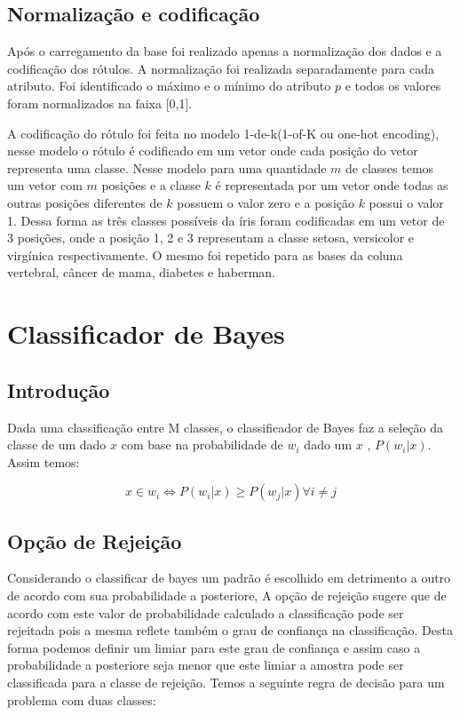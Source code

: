 \documentclass[ 
	article,			%
	11pt,				%
	oneside,			%
	a4paper,			%
	english,			%
	brazil,				%
	]{abntex2}
\begin{document}
\subsection{Normalização e codificação}
\label{ss:normCodf} 
Após o carregamento da base foi realizado apenas a normalização dos dados e a
codificação dos rótulos. A normalização foi realizada separadamente para cada
atributo. Foi identificado o máximo e o mínimo do atributo $p$ e todos os
valores foram normalizados na faixa [0,1].

A codificação do rótulo foi feita no modelo 1-de-k(1-of-K ou one-hot encoding),
nesse modelo o rótulo é codificado em um vetor onde cada posição do
vetor representa uma classe. Nesse modelo para uma quantidade $m$ de classes
temos um vetor com $m$ posições e a classe $k$ é representada por um vetor
onde todas as outras posições diferentes de $k$ possuem o valor zero e a
posição $k$ possui o valor 1. Dessa forma as três classes possíveis da íris
foram codificadas em um vetor de 3 posições, onde a posição 1, 2 e 3
representam a classe setosa, versicolor e virgínica respectivamente. O mesmo foi
repetido para as bases da coluna vertebral, câncer de mama, diabetes e haberman.


\section{Classificador de Bayes}
\subsection{Introdução}
Dada uma classificação entre M classes, o classificador de Bayes faz a seleção
da classe de um dado $x$ com base na probabilidade de $w_i$ dado um $x$ ,
$P(w_i|x)$.
Assim temos:


\begin{equation}
	x \in w_i \iff P(w_i|x) \geq P(w_j|x) \forall i \neq j
\end{equation}

\subsection{Opção de Rejeição}
Considerando o classificar de bayes um padrão é escolhido em detrimento a outro
de acordo com sua probabilidade a posteriore, A opção de rejeição sugere que de
acordo com este valor de probabilidade calculado a classificação pode ser
rejeitada pois a mesma reflete também o grau de confiança na classificação.
Desta forma podemos definir um limiar para este grau de confiança e assim caso a
probabilidade a posteriore seja menor que este limiar a amostra pode ser
classificada para a classe de rejeição. Temos a seguinte regra de
decisão para um problema com duas classes:
\end{document}
